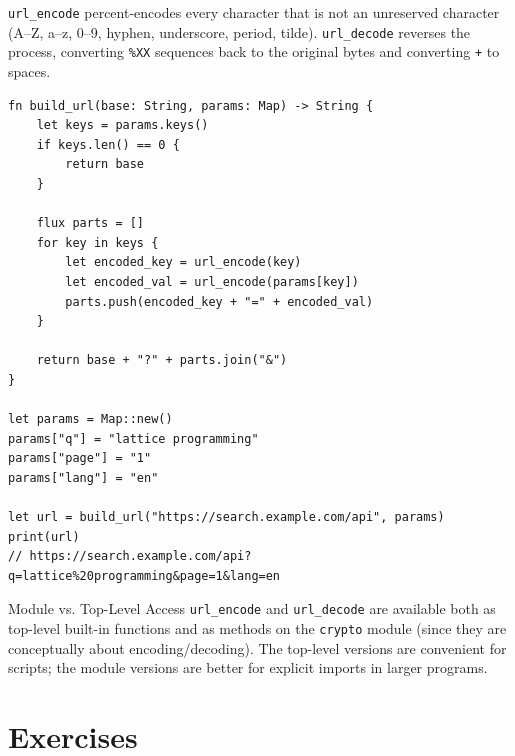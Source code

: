 \lstinline|url_encode| percent-encodes every character that is not an
unreserved character (A--Z, a--z, 0--9, hyphen, underscore, period, tilde).
\lstinline|url_decode| reverses the process, converting \texttt{\%XX}
sequences back to the original bytes and converting \texttt{+} to spaces.

\begin{lstlisting}[language=Lattice, caption={Building a URL with query parameters}]
fn build_url(base: String, params: Map) -> String {
    let keys = params.keys()
    if keys.len() == 0 {
        return base
    }

    flux parts = []
    for key in keys {
        let encoded_key = url_encode(key)
        let encoded_val = url_encode(params[key])
        parts.push(encoded_key + "=" + encoded_val)
    }

    return base + "?" + parts.join("&")
}

let params = Map::new()
params["q"] = "lattice programming"
params["page"] = "1"
params["lang"] = "en"

let url = build_url("https://search.example.com/api", params)
print(url)
// https://search.example.com/api?q=lattice%20programming&page=1&lang=en
\end{lstlisting}

\begin{notebox}{Module vs. Top-Level Access}
\lstinline|url_encode| and \lstinline|url_decode| are available both as
top-level built-in functions and as methods on the \lstinline|crypto| module
(since they are conceptually about encoding/decoding). The top-level versions
are convenient for scripts; the module versions are better for explicit
imports in larger programs.
\end{notebox}

\section*{Exercises}\label{sec:networking-exercises}

